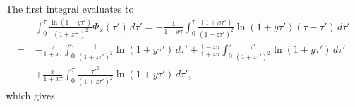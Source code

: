 \documentclass[11pt]{article}
\begin{document}
The first integral evaluates to 
\begin{align}\label{eq:log_phi_int}
    \quad& \int_0^{\tau} \frac{\ln(1+y\tau')}{(1+z\tau')^2} \Phi_x(\tau') \,d\tau' 
    = -\frac{1}{1+x\tau} \int_0^{\tau} \frac{(1+x\tau')}{(1+z\tau')^2} \ln(1+y\tau')(\tau-\tau') \,d\tau' \\\nonumber
    =& -\frac{\tau}{1+x\tau}\int_0^{\tau} \frac{1}{(1+z\tau')^2} \ln(1+y\tau')\,d\tau' 
    + \frac{1-x\tau}{1+x\tau}\int_0^{\tau} \frac{\tau'}{(1+z\tau')^2} \ln(1+y\tau')\,d\tau' \\\nonumber
    &+ \frac{x}{1+x\tau}\int_0^{\tau} \frac{\tau'^2}{(1+z\tau')^2} \ln(1+y\tau')\,d\tau', %
\end{align}
which gives
\end{document}
